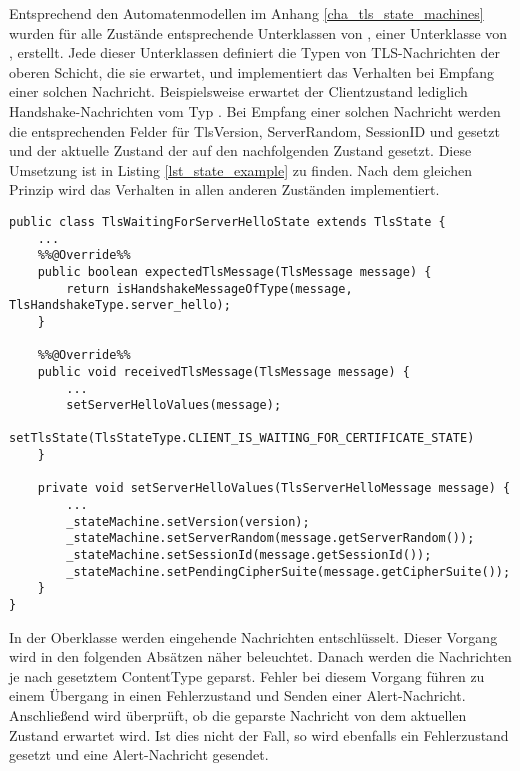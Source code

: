 Entsprechend den Automatenmodellen im Anhang \ref{cha_tls_state_machines} wurden für alle Zustände entsprechende Unterklassen von , einer Unterklasse von , erstellt. Jede dieser Unterklassen definiert die Typen von TLS-Nachrichten der oberen Schicht, die sie erwartet, und implementiert das Verhalten bei Empfang einer solchen Nachricht. Beispielsweise erwartet der Clientzustand  lediglich Handshake-Nachrichten vom Typ \serverhello{}. Bei Empfang einer solchen Nachricht werden die entsprechenden Felder für TlsVersion, ServerRandom, SessionID und \ciphersuite{} gesetzt und der aktuelle Zustand der  auf den nachfolgenden Zustand gesetzt. Diese Umsetzung ist in Listing \ref{lst_state_example} zu finden. Nach dem gleichen Prinzip wird das Verhalten in allen anderen Zuständen implementiert.


\begin{lstlisting}
public class TlsWaitingForServerHelloState extends TlsState {
	...
	%%@Override%%
	public boolean expectedTlsMessage(TlsMessage message) {
		return isHandshakeMessageOfType(message, TlsHandshakeType.server_hello);
	}

	%%@Override%%
	public void receivedTlsMessage(TlsMessage message) {
		...
		setServerHelloValues(message);
		setTlsState(TlsStateType.CLIENT_IS_WAITING_FOR_CERTIFICATE_STATE)
	}

	private void setServerHelloValues(TlsServerHelloMessage message) {
		...
		_stateMachine.setVersion(version);
		_stateMachine.setServerRandom(message.getServerRandom());
		_stateMachine.setSessionId(message.getSessionId());
		_stateMachine.setPendingCipherSuite(message.getCipherSuite());
	}
}
\end{lstlisting}

In der Oberklasse  werden eingehende Nachrichten entschlüsselt. Dieser Vorgang wird in den folgenden Absätzen näher beleuchtet. Danach werden die Nachrichten je nach gesetztem ContentType geparst. Fehler bei diesem Vorgang führen zu einem Übergang in einen Fehlerzustand und Senden einer Alert-Nachricht. Anschließend wird überprüft, ob die geparste Nachricht von dem aktuellen Zustand erwartet wird. Ist dies nicht der Fall, so wird ebenfalls ein Fehlerzustand gesetzt und eine Alert-Nachricht gesendet.

